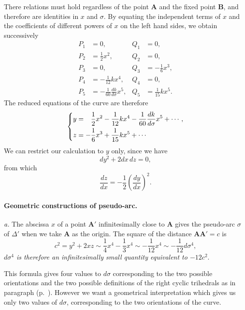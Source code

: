 There relations must hold regardless of the point $\mathbf{A}$ and the fixed point $\mathbf{B}$, and therefore are identities in $x$ and $\sigma$. By equating the independent terms of $x$ and the coefficients of different powers of $x$ on the left hand sides, we obtain successively
\begin{align*}
  P_{1}&=0,&Q_{1}&=0,\\
  P_{2}&=\frac{1}{2}x^{2},&Q_{2}&=0,\\
  P_{3}&=0,&Q_{3}&=-\frac{1}{6}x^{3},\\
  P_{4}&=-\frac{1}{12}kx^{4},&Q_{4}&=0,\\
  P_{5}&=-\frac{1}{60}\frac{dk}{d\sigma}x^{5},&Q_{5}&=\frac{1}{15}kx^{5}.
\end{align*}
The reduced equations of the curve are therefore
\begin{equation}
  \label{eq:2.26}
  \left\{
    \begin{aligned}
      y&=\hphantom{+}\frac{1}{2}x^{2}-\frac{1}{12}kx^{4}-\frac{1}{60}\frac{dk}{d\sigma}x^{5}+\cdots,\\
      z&=-\frac{1}{6}x^{3}+\frac{1}{15}kx^{5}+\cdots
    \end{aligned}
  \right.
\end{equation}
We can restrict our calculation to $y$ only, since we have
\[
dy^{2}+2dx\,dz=0,
\]
from which
\[
\frac{dz}{dx}=-\frac{1}{2}\left(\frac{dy}{dx}\right)^{2}.
\]

\paragraph{Geometric constructions of pseudo-arc.}
\label{sec:40}
\emph{a.} The abscissa $x$ of a point $\mathbf{A}'$ infinitesimally close to $\mathbf{A}$ gives the pseudo-arc $\sigma$ of $\Delta'$ when we take $\mathbf{A}$ as the origin. The square of the distance $\mathbf{AA}'=c$ is
\begin{equation}
  \label{eq:2.27}
  c^{2}=y^{2}+2xz\sim \frac{1}{4}x^{4}-\frac{1}{3}x^{4}\sim-\frac{1}{12}x^{4}\sim-\frac{1}{12}d\sigma^{4},
\end{equation}
\emph{$d\sigma^{4}$ is therefore an infinitesimally small quantity equivalent to $-12c^{2}$}.

This formula gives four values to $d\sigma$ corresponding to the two possible orientations and the two possible definitions of the right cyclic trihedrals as in paragraph  (p.~\pageref{sec:23}). However we want a geometrical interpretation which gives us only two values of $d\sigma$, corresponding to the two orientations of the curve.

